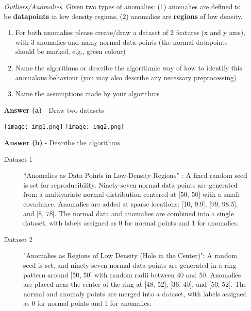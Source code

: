 \documentclass[a4paper,10pt]{article}\setlength{\textheight}{10in}\setlength{\textwidth}{6.5in}\setlength{\topmargin}{-0.125in}\setlength{\oddsidemargin}{-.2in}\setlength{\evensidemargin}{-.2in}\setlength{\headsep}{0.2in}\setlength{\footskip}{0pt}\usepackage{amsmath}\usepackage{fancyhdr}\usepackage{enumitem}\usepackage{hyperref}\usepackage{xcolor}\usepackage{graphicx}\usepackage[export]{adjustbox}\usepackage{caption}\usepackage{float}\usepackage{booktabs}\usepackage{makecell}\pagestyle{fancy}
\begin{document}
\begin{enumerate}[topsep=0mm, partopsep=0mm, leftmargin=*]
{\color{blue}
\clearpage\item \textit{Outliers/Anomalies}. Given two types of anomalies: (1) anomalies are defined to be \textbf{datapoints} in low density regions, (2) anomalies are \textbf{regions} of low density.
\begin{enumerate}
\item For both anomalies please create/draw a dataset of 2 features (x and y axis), with 3 anomalies and many normal data points (the normal datapoints should be marked, e.g., green colour)
\item Name the algorithms or describe the algorithmic way of how to identify this anomalous behaviour (you may also describe any necessary preprocessing)
\item Name the assumptions made by your algorithms
\end{enumerate}}




\textbf{Answer (a)} - Draw two datasets %
    \begin{center}
    \texttt{[image: img1.png]}
        \hspace{2cm}
    \texttt{[image: img2.png]}
    \end{center}


\textbf{Answer (b)} - Describe the algorithms 
\begin{description}
	\item[Dataset 1] ``Anomalies as Data Points in Low-Density Regions'' : A fixed random seed is set for reproducibility. Ninety-seven normal data points are generated from a multivariate normal distribution centered at [50, 50] with a small covariance. Anomalies are added at sparse locations: [10, 9.9], [99, 98.5],  and [8, 78]. The normal data and anomalies are combined into a single dataset, with labels assigned as 0 for normal points and 1 for anomalies.
	\item[Dataset 2] "Anomalies as Regions of Low Density (Hole in the Center)": A random seed is set, and ninety-seven normal data points are generated in a ring pattern around [50, 50] with random radii between 40 and 50. Anomalies are placed near the center of the ring at [48, 52], [36, 40], and [50, 52]. The normal and anomaly points are merged into a dataset, with labels assigned as 0 for normal points and 1 for anomalies.
\end{description}



\end{enumerate}
\end{document}
